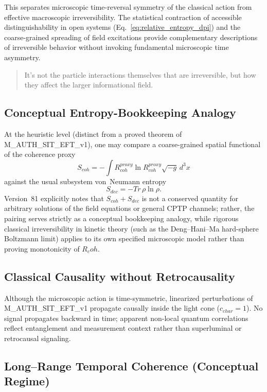 \documentclass[american,11pt,letterpaper]{article}
\newcommand{\Rcoh}{R_{\mathrm{coh}}}
\newcommand{\blockquote}[1]{\begin{quote}#1\end{quote}}
\def\mathrm#1{#1}%
\def\texttt#1{#1}%
\def\emph#1{#1}%
\def\Rcoh{R_coh}%
\begin{document}
This separates microscopic time-reversal symmetry of the classical action from effective macroscopic irreversibility. The statistical contraction of accessible distinguishability in open systems (Eq.~\eqref{eq:relative_entropy_dpi}) and the coarse-grained spreading of field excitations provide complementary descriptions of irreversible behavior without invoking fundamental microscopic time asymmetry.

\blockquote{
It's not the particle interactions themselves that are irreversible, but how they affect the larger informational field.
}

\subsection{Conceptual Entropy-Bookkeeping Analogy}

At the heuristic level (distinct from a proved theorem of \texttt{M\_AUTH\_SIT\_EFT\_v1}), one may compare a coarse-grained spatial functional of the coherence proxy
\[
S_{\mathrm{coh}} = -\int R_{\mathrm{coh}}^{\mathrm{proxy}}\ln R_{\mathrm{coh}}^{\mathrm{proxy}}\sqrt{-g}\,d^{3}x
\]
against the usual subsystem von~Neumann entropy
\[
S_{\mathrm{dec}} = -\mathrm{Tr}\,\rho\ln\rho.
\]
Version~81 explicitly notes that $S_{\mathrm{coh}} + S_{\mathrm{dec}}$ is \emph{not} a conserved quantity for arbitrary solutions of the field equations or general CPTP channels; rather, the pairing serves strictly as a conceptual bookkeeping analogy, while rigorous classical irreversibility in kinetic theory (such as the Deng--Hani--Ma hard-sphere Boltzmann limit) applies to its own specified microscopic model rather than proving monotonicity of $\Rcoh$.

\subsection{Classical Causality without Retrocausality}

Although the microscopic action is time-symmetric, linearized perturbations of \texttt{M\_AUTH\_SIT\_EFT\_v1} propagate causally inside the light cone ($c_{\mathrm{char}} = 1$). No signal propagates backward in time; apparent non-local quantum correlations reflect entanglement and measurement context rather than superluminal or retrocausal signaling.

\subsection{Long--Range Temporal Coherence (Conceptual Regime)}
\end{document}
